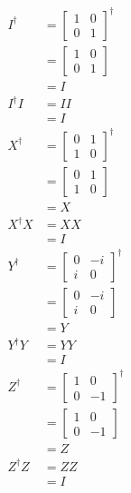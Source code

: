 \documentclass{article}
\begin{document}
\begin{align*}
  I^\dag   & = \begin{bmatrix}
                 1 & 0 \\
                 0 & 1
               \end{bmatrix}^\dag \\
           & = \begin{bmatrix}
                 1 & 0 \\
                 0 & 1
               \end{bmatrix}     \\
           & = I                  \\
  I^\dag I & = I I                \\
           & = I                  \\
  X^\dag   & = \begin{bmatrix}
                 0 & 1 \\
                 1 & 0
               \end{bmatrix}^\dag \\
           & = \begin{bmatrix}
                 0 & 1 \\
                 1 & 0
               \end{bmatrix}     \\
           & = X                  \\
  X^\dag X & = X X                \\
           & = I                  \\
  Y^\dag   & = \begin{bmatrix}
                 0 & -i \\
                 i & 0
               \end{bmatrix}^\dag \\
           & = \begin{bmatrix}
                 0 & -i \\
                 i & 0
               \end{bmatrix}     \\
           & = Y                  \\
  Y^\dag Y & = Y Y                \\
           & = I                  \\
  Z^\dag   & = \begin{bmatrix}
                 1 & 0  \\
                 0 & -1
               \end{bmatrix}^\dag \\
           & = \begin{bmatrix}
                 1 & 0  \\
                 0 & -1
               \end{bmatrix}     \\
           & = Z                  \\
  Z^\dag Z & = Z Z                \\
           & = I
\end{align*}
\end{document}
